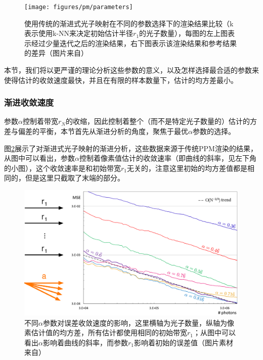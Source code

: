 \begin{figure}
\begin{fullwidth}
	\texttt{[image: figures/pm/parameters]}
	\caption{使用传统的渐进式光子映射在不同的参数选择下的渲染结果比较（k表示使用k-NN来决定初始估计半径$r_1$的光子数量），每图的左上图表示经过少量迭代之后的渲染结果，右下图表示该渲染结果和参考结果的差异（图片来自\cite{a:AdaptiveProgressivePhotonMapping}）}	
	\label{f:pm-parameters}
\end{fullwidth}
\end{figure}

本节，我们将以更严谨的理论分析这些参数的意义，以及怎样选择最合适的参数来使得估计的收敛速度最快，并且在有限的样本数量下，估计的均方差最小。





\subsubsection{渐进收敛速度}
参数$\alpha$控制着带宽$r_N$的收缩，因此控制着整个（而不是特定光子数量的）估计的方差与偏差的平衡，本节首先从渐进分析的角度，聚焦于最优$\alpha$参数的选择。

图\ref{f:pm-alpha}展示了对渐进式光子映射的渐进分析，这些数据来源于传统PPM渲染的结果，从图中可以看出，参数$\alpha$控制着像素值估计的收敛速率（即曲线的斜率，见左下角的小图），这个收敛速率是和初始带宽$r_1$无关的，注意这里初始的均方差值都是相同的，但是这里只截取了末端的部分。

\begin{figure}
	\includegraphics[width=1.\textwidth]{figures/pm/alpha}
	\caption{不同$\alpha$参数对误差收敛速度的影响，这里横轴为光子数量，纵轴为像素估计值的均方差，所有估计都使用相同的初始带宽$r_1$；从图中可以看出$\alpha$影响着曲线的斜率，而参数$r_1$影响着初始的误差值（图片素材来自\cite{a:AdaptiveProgressivePhotonMapping}）}
	\label{f:pm-alpha}
\end{figure}

